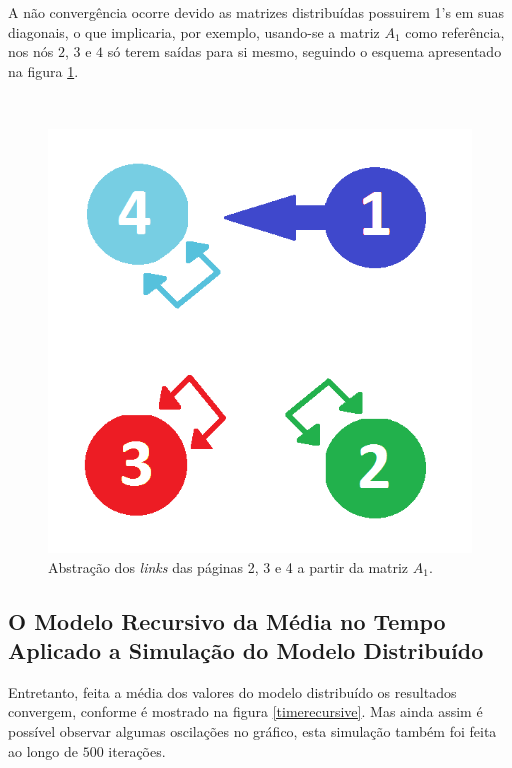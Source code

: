 A não convergência ocorre devido as matrizes distribuídas possuirem 1's em suas diagonais, o que implicaria, por exemplo, usando-se a matriz $A_1$ como referência, nos nós $2$, $3$ e $4$ só terem saídas para si mesmo, seguindo o esquema apresentado na figura \ref{loop}.

\
\begin{figure}[!htb]
	\centering
	\includegraphics[scale=0.4]{imagens/loop}
	\caption{Abstração dos \textit{links} das páginas 2, 3 e 4 a partir da matriz $A_1$.}
	\label{loop}
\end{figure}

\subsection{O Modelo Recursivo da Média no Tempo Aplicado a Simulação do Modelo Distribuído}%

Entretanto, feita a média dos valores do modelo distribuído os resultados convergem, conforme é mostrado na figura \ref{timerecursive}. Mas ainda assim é possível observar algumas oscilações no gráfico, esta simulação também foi feita ao longo de $500$ iterações.

